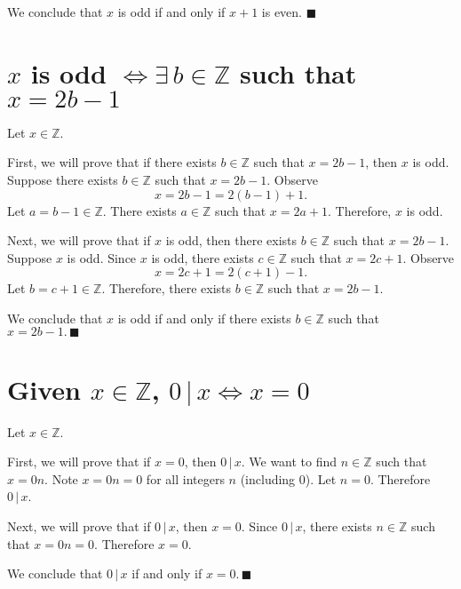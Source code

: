 \documentclass[12pt]{article}
\begin{document}
We conclude that $x$ is odd if and only if $x+1$ is even. $\blacksquare$
\section{$x$ is odd $\iff\exists\,b\in\mathbb{Z}$ such that $x=2b-1$}
Let $x\in\mathbb{Z}$. 

First, we will prove that if there exists $b\in\mathbb{Z}$ such that $x=2b-1$, then $x$ is odd. Suppose there exists $b\in\mathbb{Z}$ such that $x=2b-1$. Observe
\[x=2b-1=2(b-1)+1.\]
Let $a=b-1\in\mathbb{Z}$. There exists $a\in\mathbb{Z}$ such that $x=2a+1$. Therefore, $x$ is odd.

Next, we will prove that if $x$ is odd, then there exists $b\in\mathbb{Z}$ such that $x=2b-1$. Suppose $x$ is odd. Since $x$ is odd, there exists $c\in\mathbb{Z}$ such that $x=2c+1$. Observe
\[x=2c+1=2(c+1)-1.\]
Let $b=c+1\in\mathbb{Z}$. Therefore, there exists $b\in\mathbb{Z}$ such that $x=2b-1$.

We conclude that $x$ is odd if and only if there exists $b\in\mathbb{Z}$ such that $x=2b-1.\,\blacksquare$
\section{Given $x\in\mathbb{Z}$, $0\,|\,x \iff x=0$}
Let $x\in\mathbb{Z}$.

First, we will prove that if $x=0$, then $0\,|\,x$. We want to find $n\in\mathbb{Z}$ such that $x=0n$. Note $x=0n=0$ for all integers $n$ (including 0). Let $n=0$. Therefore $0\,|\,x$.

Next, we will prove that if $0\,|\,x$, then $x=0$. Since $0\,|\,x$, there exists $n\in\mathbb{Z}$ such that $x=0n=0$. Therefore $x=0$.

We conclude that $0\,|\,x$ if and only if $x=0.\,\blacksquare$
\end{document}
